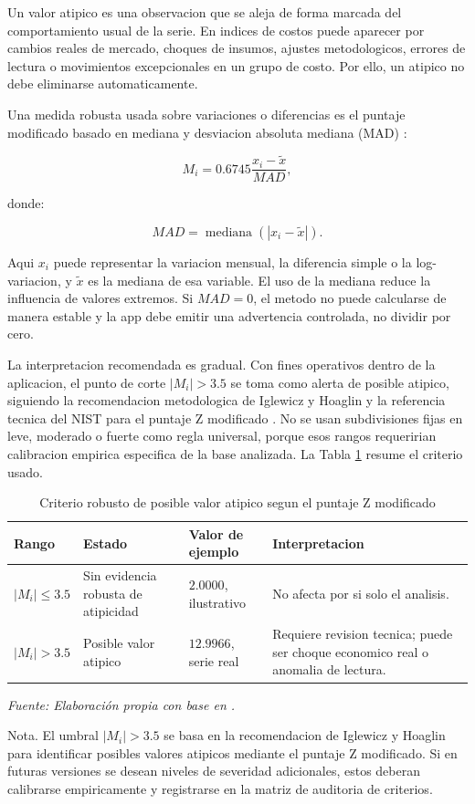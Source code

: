 ﻿\documentclass[12pt,letterpaper]{article}
\begin{document}
Un valor atipico es una observacion que se aleja de forma marcada del comportamiento usual de la serie. En indices de costos puede aparecer por cambios reales de mercado, choques de insumos, ajustes metodologicos, errores de lectura o movimientos excepcionales en un grupo de costo. Por ello, un atipico no debe eliminarse automaticamente.

Una medida robusta usada sobre variaciones o diferencias es el puntaje modificado basado en mediana y desviacion absoluta mediana (MAD) \citep{nist_outliers}:

\[
M_i = 0.6745\frac{x_i-\tilde{x}}{MAD},
\]

donde:

\[
MAD=\operatorname{mediana}(|x_i-\tilde{x}|).
\]

Aqui \(x_i\) puede representar la variacion mensual, la diferencia simple o la log-variacion, y \(\tilde{x}\) es la mediana de esa variable. El uso de la mediana reduce la influencia de valores extremos. Si \(MAD=0\), el metodo no puede calcularse de manera estable y la app debe emitir una advertencia controlada, no dividir por cero.

La interpretacion recomendada es gradual. Con fines operativos dentro de la aplicacion, el punto de corte \(|M_i|>3.5\) se toma como alerta de posible atipico, siguiendo la recomendacion metodologica de Iglewicz y Hoaglin y la referencia tecnica del NIST para el puntaje Z modificado \citep{nist_outliers}. No se usan subdivisiones fijas en leve, moderado o fuerte como regla universal, porque esos rangos requeririan calibracion empirica especifica de la base analizada. La Tabla \ref{tab:clasificacion_atipicos_modified_z} resume el criterio usado.

\begin{table}[H]
\centering
\caption{Criterio robusto de posible valor atipico segun el puntaje Z modificado}
\label{tab:clasificacion_atipicos_modified_z}
\begin{tabularx}{\textwidth}{p{3.0cm}p{3.6cm}p{3.1cm}X}
\toprule
Rango & Estado & Valor de ejemplo & Interpretacion \\
\midrule
\(|M_i|\leq 3.5\) & Sin evidencia robusta de atipicidad & \(2.0000\), ilustrativo & No afecta por si solo el analisis. \\
\(|M_i|>3.5\) & Posible valor atipico & \(12.9966\), serie real & Requiere revision tecnica; puede ser choque economico real o anomalia de lectura. \\
\bottomrule
\end{tabularx}
\par\footnotesize\textit{Fuente: Elaboración propia con base en \citet{nist_outliers}.}
\par\footnotesize Nota. El umbral \(|M_i|>3.5\) se basa en la recomendacion de Iglewicz y Hoaglin para identificar posibles valores atipicos mediante el puntaje Z modificado. Si en futuras versiones se desean niveles de severidad adicionales, estos deberan calibrarse empiricamente y registrarse en la matriz de auditoria de criterios.
\end{table}
\end{document}
